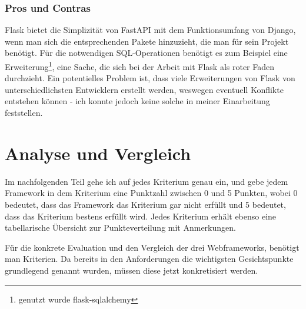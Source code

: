 \documentclass[letterpaper,11pt,leqno]{article}
\begin{document}
\subsubsection{Pros und Contras}
Flask bietet die Simplizität von FastAPI mit dem Funktionsumfang von Django, wenn man sich die entsprechenden Pakete hinzuzieht, die
man für sein Projekt benötigt. Für die notwendigen SQL-Operationen benötigt es zum Beispiel eine Erweiterung\footnote{genutzt wurde
flask-sqlalchemy}, eine Sache, die sich bei der Arbeit mit Flask als roter Faden durchzieht. Ein potentielles Problem ist, dass
viele Erweiterungen von Flask von unterschiedlichsten Entwicklern erstellt werden, weswegen eventuell Konflikte entstehen können -
ich konnte jedoch keine solche in meiner Einarbeitung feststellen.

\section{Analyse und Vergleich}
Im nachfolgenden Teil gehe ich auf jedes Kriterium genau ein, und gebe jedem Framework in dem Kriterium eine Punktzahl zwischen 0
und 5 Punkten, wobei 0 bedeutet, dass das Framework das Kriterium gar nicht erfüllt und 5 bedeutet, dass das Kriterium bestens
erfüllt wird. Jedes Kriterium erhält ebenso eine tabellarische Übersicht zur Punkteverteilung mit Anmerkungen.

Für die konkrete Evaluation und den Vergleich der drei Webframeworks, benötigt man Kriterien. Da bereits in den Anforderungen die
wichtigsten Gesichtspunkte grundlegend genannt wurden, müssen diese jetzt konkretisiert werden.
\end{document}
